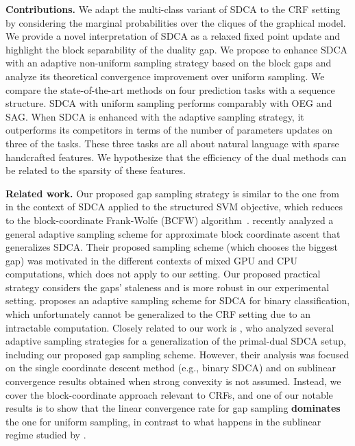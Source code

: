 \textbf{Contributions.} We adapt the multi-class variant of SDCA to the CRF setting by considering the marginal probabilities over the cliques of the graphical model.
We provide a novel interpretation of SDCA as a relaxed fixed point update and highlight the block separability of the duality gap.
We propose to enhance SDCA with an adaptive non-uniform sampling strategy based on the block gaps and analyze its theoretical convergence improvement over uniform sampling.
We compare the state-of-the-art methods on four prediction tasks with a sequence structure.
SDCA with uniform sampling performs comparably with OEG and SAG.
When SDCA is enhanced with the adaptive sampling strategy, it outperforms its competitors in terms of the number of parameters updates on three of the tasks.
These three tasks are all about natural language with sparse handcrafted features.
We hypothesize that the efficiency of the dual methods can be related to the sparsity of these features.

\textbf{Related work.}
Our proposed gap sampling strategy is similar to the one from~\citet{osokin2016minding} in the context of SDCA applied to the structured SVM objective, which reduces to the block-coordinate Frank-Wolfe (BCFW) algorithm~\citep{lacoste2013block}.
\citet{dunner2017efficient} recently analyzed a general adaptive sampling scheme for approximate block coordinate ascent that generalizes SDCA.
Their proposed sampling scheme (which chooses the biggest gap) was motivated in the different contexts of mixed GPU and CPU computations, which does not apply to our setting.
Our proposed practical strategy considers the gaps' staleness and is more robust in our experimental setting.
\citet{csiba2015stochastic} proposes an adaptive sampling scheme for SDCA for binary classification, which unfortunately cannot be generalized to the CRF setting due to an intractable computation. Closely related to our work is \citet{perekrestenko17a}, who analyzed several adaptive sampling strategies for a generalization of the primal-dual SDCA setup, including our proposed gap sampling scheme. However, their analysis was focused on the single coordinate descent method (e.g., binary SDCA) and on sublinear convergence results obtained when strong convexity is not assumed. Instead, we cover the block-coordinate approach relevant to CRFs, and one of our notable results is to show that the linear convergence rate for gap sampling \textbf{dominates} the one for uniform sampling, in contrast to what happens in the sublinear regime studied by \citet{perekrestenko17a}. 


